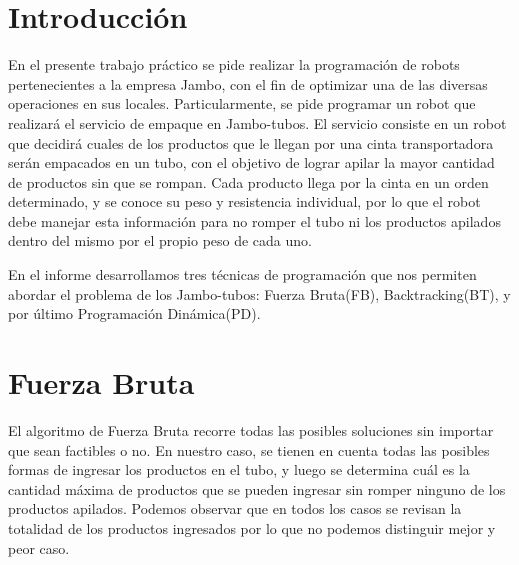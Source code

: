 \documentclass[10pt,a4paper]{article}
\begin{document}

\subtitulo{}

\fecha{\today}



\maketitle

\tableofcontents

\newpage

\setcounter{page}{1}

\section{Introducción} \label{sec:introduccion}
En el presente trabajo práctico se pide realizar la programación de robots pertenecientes a la empresa Jambo, con el fin de optimizar una de las diversas operaciones en sus locales. Particularmente, se pide programar un robot que realizará el servicio de empaque en Jambo-tubos. El servicio consiste en un robot que decidirá cuales de los productos que le llegan por una cinta transportadora serán empacados en un tubo, con el objetivo de lograr apilar la mayor cantidad de productos sin que se rompan. Cada producto llega por la cinta en un orden determinado, y se conoce su peso y resistencia individual, por lo que el robot debe manejar esta información para no romper el tubo ni los productos apilados dentro del mismo por el propio peso de cada uno. \cite{ref:enunciado}

En el informe desarrollamos tres técnicas de programación que nos permiten abordar el problema de los Jambo-tubos: Fuerza Bruta(FB), Backtracking(BT), y por último Programación Dinámica(PD).

\section{Fuerza Bruta} \label{sec:fuerza_bruta}
El algoritmo de Fuerza Bruta recorre todas las posibles soluciones sin importar que sean factibles o no. En nuestro caso, se tienen en cuenta todas las posibles formas de ingresar los productos en el tubo, y luego se determina cuál es la cantidad máxima de productos que se pueden ingresar sin romper ninguno de los productos apilados. Podemos observar que en todos los casos se revisan la totalidad de los productos ingresados por lo que no podemos distinguir mejor y peor caso.
\end{document}
